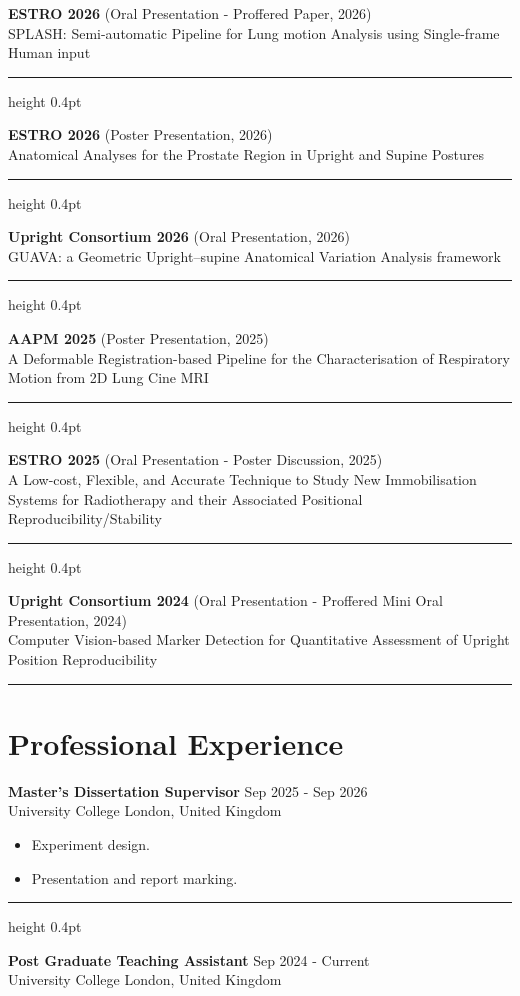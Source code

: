 \documentclass[11pt,a4paper]{article}
\newcommand{\sectionline}{
    \vspace{6pt}
    \hrule
    \vspace{10pt}
}
\newcommand{\subline}{
    \vspace{4pt}
    \hrule height 0.4pt
    \vspace{6pt}
}
\begin{document}
\textbf{ESTRO 2026} (Oral Presentation - Proffered Paper, 2026) \\
SPLASH: Semi-automatic Pipeline for Lung motion Analysis using Single-frame Human input

\subline

\textbf{ESTRO 2026} (Poster Presentation, 2026) \\
Anatomical Analyses for the Prostate Region in Upright and Supine Postures

\subline

\textbf{Upright Consortium 2026} (Oral Presentation, 2026) \\
GUAVA: a Geometric Upright–supine Anatomical Variation Analysis framework

\subline

\textbf{AAPM 2025} (Poster Presentation, 2025) \\
A Deformable Registration-based Pipeline for the Characterisation of Respiratory Motion from 2D Lung Cine MRI

\subline

\textbf{ESTRO 2025} (Oral Presentation - Poster Discussion, 2025) \\
A Low-cost, Flexible, and Accurate Technique to Study New Immobilisation Systems for Radiotherapy and their Associated Positional Reproducibility/Stability

\subline

\textbf{Upright Consortium 2024} (Oral Presentation - Proffered Mini Oral Presentation, 2024) \\
Computer Vision-based Marker Detection for Quantitative Assessment of Upright Position Reproducibility

\sectionline
\section*{Professional Experience}

\textbf{Master's Dissertation Supervisor} \hfill Sep 2025 - Sep 2026 \\
University College London, United Kingdom

\begin{itemize}
    \item Experiment design.
    \item Presentation and report marking.
\end{itemize}

\subline

\textbf{Post Graduate Teaching Assistant} \hfill Sep 2024 - Current \\
University College London, United Kingdom
\end{document}
